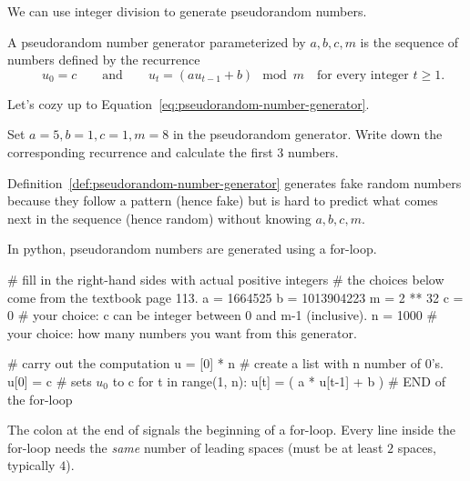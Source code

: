 \documentclass[../main.tex]{subfiles}
\begin{document}
We can use integer division to generate pseudorandom numbers. 
\begin{definition} \label{def:pseudorandom-number-generator}
  A pseudorandom number generator parameterized by \(a,b,c,m\) is the sequence of numbers defined by the recurrence
  \begin{equation} \label{eq:pseudorandom-number-generator}
    \quad u_{0} = c \qquad\text{and}\qquad u_{t} = (a u_{t-1} + b) \mod m \quad\text{for every integer \(t \ge 1\)}.
  \end{equation}
\end{definition}

Let's cozy up to Equation~\ref{eq:pseudorandom-number-generator}.
\begin{example}
  Set \(a = 5, b = 1, c = 1, m = 8\) in the pseudorandom generator. Write down the corresponding recurrence and calculate the first \(3\) numbers. 

  \blanks*
\end{example}
\clearpage

Definition~\ref{def:pseudorandom-number-generator} generates fake random numbers because they follow a pattern (hence fake) but is hard to predict what comes next in the sequence (hence random) without knowing \(a,b,c,m\).

In python, pseudorandom numbers are generated using a for-loop.

\begin{listing}[h!]
  \begin{pythoncode}
# fill in the right-hand sides with actual positive integers
# the choices below come from the textbook page 113.
a = 1664525 
b = 1013904223
m = 2 ** 32
c = 0            # your choice: c can be integer between 0 and m-1 (inclusive).
n = 1000         # your choice: how many numbers you want from this generator.

# carry out the computation
u = [0] * n      # create a list with n number of 0's.
u[0] = c         # sets $u_{0}$ to c
for t in range(1, n): 
    u[t] = ( a * u[t-1] + b ) %
# END of the for-loop
  \end{pythoncode}

  \caption{Python code for pseudorandom number generator}
  \label{lst:pseudorandom-number-generator}
\end{listing}

\faExclamationTriangle{} The colon at the end of  signals the beginning of a for-loop. Every line inside the for-loop needs the \emph{same} number of leading spaces (must be at least \(2\) spaces, typically \(4\)).
\end{document}
